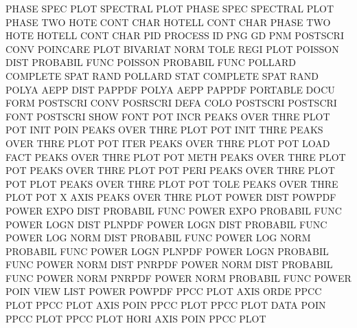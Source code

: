 PHASE    SPEC PLOT                      SPECTRAL PLOT
PHASE    SPEC                           SPECTRAL PLOT
PHASE    TWO  HOTE CONT CHAR            HOTELL   CONT CHAR
PHASE    TWO  HOTE                      HOTELL   CONT CHAR
PID                                     PROCESS  ID
PNG                                     GD
PNM                                     POSTSCRI CONV
POINCARE PLOT                           BIVARIAT NORM TOLE REGI PLOT
POISSON  DIST                           PROBABIL FUNC
POISSON                                 PROBABIL FUNC
POLLARD                                 COMPLETE SPAT RAND
POLLARD  STAT                           COMPLETE SPAT RAND
POLYA    AEPP DIST                      PAPPDF
POLYA    AEPP                           PAPPDF
PORTABLE DOCU FORM                      POSTSCRI CONV
POSRSCRI DEFA COLO                      POSTSCRI
POSTSCRI FONT                           POSTSCRI SHOW FONT
POT      INCR                           PEAKS    OVER THRE PLOT
POT      INIT POIN                      PEAKS    OVER THRE PLOT
POT      INIT THRE                      PEAKS    OVER THRE PLOT
POT      ITER                           PEAKS    OVER THRE PLOT
POT      LOAD FACT                      PEAKS    OVER THRE PLOT
POT      METH                           PEAKS    OVER THRE PLOT
POT                                     PEAKS    OVER THRE PLOT
POT      PERI                           PEAKS    OVER THRE PLOT
POT      PLOT                           PEAKS    OVER THRE PLOT
POT      TOLE                           PEAKS    OVER THRE PLOT
POT      X    AXIS                      PEAKS    OVER THRE PLOT
POWER    DIST                           POWPDF
POWER    EXPO DIST                      PROBABIL FUNC
POWER    EXPO                           PROBABIL FUNC
POWER    LOGN DIST                      PLNPDF
POWER    LOGN DIST                      PROBABIL FUNC
POWER    LOG  NORM DIST                 PROBABIL FUNC
POWER    LOG  NORM                      PROBABIL FUNC
POWER    LOGN                           PLNPDF
POWER    LOGN                           PROBABIL FUNC
POWER    NORM DIST                      PNRPDF
POWER    NORM DIST                      PROBABIL FUNC
POWER    NORM                           PNRPDF
POWER    NORM                           PROBABIL FUNC
POWER    POIN VIEW                      LIST
POWER                                   POWPDF
PPCC     PLOT AXIS ORDE                 PPCC     PLOT
PPCC     PLOT AXIS POIN                 PPCC     PLOT
PPCC     PLOT DATA POIN                 PPCC     PLOT
PPCC     PLOT HORI AXIS POIN            PPCC     PLOT
